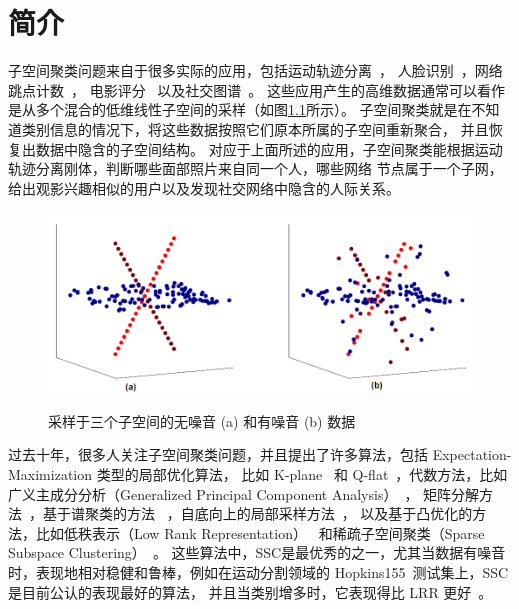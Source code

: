 \documentclass[main]{subfiles}
\begin{document}
\chapter{简介}\label{chp:intro}

子空间聚类问题来自于很多实际的应用，包括运动轨迹分离~\cite{costeira1998motion_seg}，
人脸识别~\cite{basri2003lambertianface}，网络跳点计数~\cite{eriksson2011high_rankMC}，
电影评分~\cite{zhang2012RecSys} 以及社交图谱~\cite{xu2011graphclustering}。
这些应用产生的高维数据通常可以看作是从多个混合的低维线性子空间的采样（如图\ref{fig:Union_of_sub_model}所示）。
子空间聚类就是在不知道类别信息的情况下，将这些数据按照它们原本所属的子空间重新聚合，
并且恢复出数据中隐含的子空间结构。
对应于上面所述的应用，子空间聚类能根据运动轨迹分离刚体，判断哪些面部照片来自同一个人，哪些网络
节点属于一个子网，给出观影兴趣相似的用户以及发现社交网络中隐含的人际关系。

\begin{figure}
  \centering
  \includegraphics[width=0.8\linewidth]{pics/Union_of_Subspace.png}\\
  \caption{采样于三个子空间的无噪音 (a) 和有噪音 (b) 数据}\label{fig:Union_of_sub_model}
\end{figure}

过去十年，很多人关注子空间聚类问题，并且提出了许多算法，包括 Expectation-Maximization 类型的局部优化算法，
比如 K-plane~\cite{bradley2000k-plane} 和 Q-flat~\cite{tseng2000qflat}，代数方法，比如
广义主成分分析（Generalized Principal Component Analysis）~\cite{vidal2005gpca}，
矩阵分解方法~\cite{costeira1998motion_seg,costeira2000multibody_factorization}，基于谱聚类的方法
~\cite{lauer2009spectral,chen2009spectral}，自底向上的局部采样方法~\cite{yan2006LSA,rao2008motion}，
以及基于凸优化的方法，比如低秩表示（Low Rank Representation）~\cite{liu2010lrr_icml,liu2013LRR}
和稀疏子空间聚类（Sparse Subspace Clustering）~\cite{elhamifar2009ssc,elhamifar2012ssc_journal}。
这些算法中，SSC是最优秀的之一，尤其当数据有噪音时，表现地相对稳健和鲁棒，例如在运动分割领域的
Hopkins155~\cite{tron2007benchmark,elhamifar2009ssc}测试集上，SSC是目前公认的表现最好的算法，
并且当类别增多时，它表现得比 LRR 更好~\cite{elhamifar2012ssc_journal}。
\end{document}
